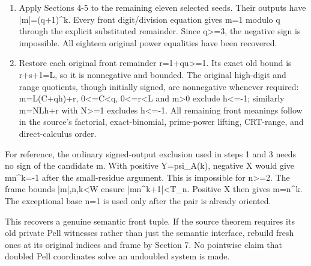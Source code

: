\begin{enumerate}
\item Apply Sections 4-5 to the remaining eleven selected seeds. Their outputs have |m|=\allowbreak{}(q+\allowbreak{}1)\textasciicircum{}\allowbreak{}k. Every front digit/\allowbreak{}division equation gives m=\allowbreak{}1 modulo q through the explicit substituted remainder. Since q\textgreater{}\allowbreak{}=\allowbreak{}3, the negative sign is impossible. All eighteen original power equalities have been recovered.

\item Restore each original front remainder r=\allowbreak{}1+\allowbreak{}q\textasteriskcentered{}\allowbreak{}u\textgreater{}\allowbreak{}=\allowbreak{}1. Its exact old bound is r+\allowbreak{}s+\allowbreak{}1=\allowbreak{}L, so it is nonnegative and bounded. The original high-digit and range quotients, though initially signed, are nonnegative whenever required: m=\allowbreak{}L(C+\allowbreak{}q\textasteriskcentered{}\allowbreak{}h)+\allowbreak{}r, 0\textless{}\allowbreak{}=\allowbreak{}C\textless{}\allowbreak{}q, 0\textless{}\allowbreak{}=\allowbreak{}r\textless{}\allowbreak{}L and m\textgreater{}\allowbreak{}0 exclude h\textless{}\allowbreak{}=\allowbreak{}-1; similarly m=\allowbreak{}N\textasteriskcentered{}\allowbreak{}L\textasteriskcentered{}\allowbreak{}h+\allowbreak{}r with N\textgreater{}\allowbreak{}=\allowbreak{}1 excludes h\textless{}\allowbreak{}=\allowbreak{}-1. All remaining front meanings follow in the source's factorial, exact-binomial, prime-power lifting, CRT-range, and direct-calculus order.

\end{enumerate}



For reference, the ordinary signed-output exclusion used in steps 1 and 3 needs no sign of the candidate m. With positive Y=\allowbreak{}psi\_\allowbreak{}A(k), negative X would give m\textasteriskcentered{}\allowbreak{}n\textasciicircum{}\allowbreak{}k=\allowbreak{}-1 after the small-residue argument. This is impossible for n\textgreater{}\allowbreak{}=\allowbreak{}2. The frame bounds |m|,n,k\textless{}\allowbreak{}W ensure |m\textasteriskcentered{}\allowbreak{}n\textasciicircum{}\allowbreak{}k+\allowbreak{}1|\textless{}\allowbreak{}T\_\allowbreak{}n. Positive X then gives m=\allowbreak{}n\textasciicircum{}\allowbreak{}k. The exceptional base n=\allowbreak{}1 is used only after the pair is already oriented.



This recovers a genuine semantic front tuple. If the source theorem requires its old private Pell witnesses rather than just the semantic interface, rebuild fresh ones at its original indices and frame by Section 7. No pointwise claim that doubled Pell coordinates solve an undoubled system is made.



